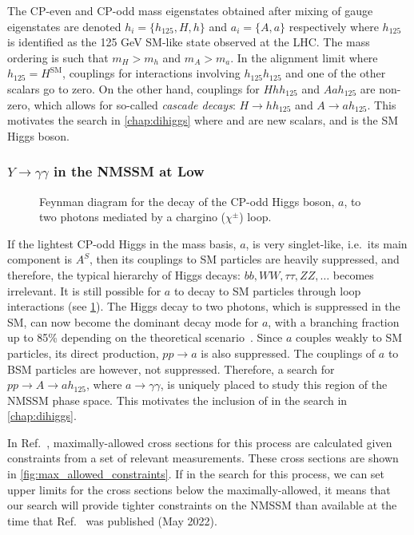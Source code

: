 The CP-even and CP-odd mass eigenstates obtained after mixing of gauge eigenstates are denoted $h_i=\{h_{125},H,h\}$ and $a_i=\{A,a\}$ respectively where $h_{125}$ is identified as the 125 GeV SM-like state observed at the LHC. The mass ordering is such that $m_H>m_h$ and $m_A>m_a$. In the alignment limit where $h_{125} = H^{\text{SM}}$, couplings for interactions involving $h_{125}h_{125}$ and one of the other scalars go to zero. On the other hand, couplings for $Hhh_{125}$ and $Aah_{125}$ are non-zero, which allows for so-called \textit{cascade decays}: $H\rightarrow h h_{125}$ and $A \rightarrow a h_{125}$. This motivates the \XYH search in \cref{chap:dihiggs} where \PX and \PY are new scalars, and \PH is the SM Higgs boson.

\subsubsection{$Y\rightarrow \gamma\gamma$ in the NMSSM at Low \mY}\label{sec:low_mass_in_NMSSM}

\begin{figure}
    \centering
    \caption[Feynman Diagram for a CP-Odd Higgs Boson Decaying to Two Photons Via a Chargino Loop]{Feynman diagram for the decay of the CP-odd Higgs boson, $a$, to two photons mediated by a chargino ($\chi^\pm$) loop.}\label{fig:a_gamgam}
   \end{figure}

If the lightest CP-odd Higgs in the mass basis, $a$, is very singlet-like, i.e.\ its main component is $A^S$, then its couplings to SM particles are heavily suppressed, and therefore, the typical hierarchy of Higgs decays: $bb, WW, \tau\tau, ZZ,\ldots$ becomes irrelevant. It is still possible for $a$ to decay to SM particles through loop interactions (see \cref{fig:a_gamgam}). The Higgs decay to two photons, which is suppressed in the SM, can now become the dominant decay mode for $a$, with a branching fraction up to 85\% depending on the theoretical scenario~\cite{King:2014xwa}. Since $a$ couples weakly to SM particles, its direct production, $pp \to a$ is also suppressed. The couplings of $a$ to BSM particles are however, not suppressed. Therefore, a search for $pp \rightarrow A \rightarrow a h_{125}$, where $a\to\gamma\gamma$, is uniquely placed to study this region of the NMSSM phase space. This motivates the inclusion of \Ygg in the \XYH search in \cref{chap:dihiggs}. 

In Ref.~\cite{Ellwanger:2022jtd}, maximally-allowed cross sections for this process are calculated given constraints from a set of relevant measurements. These cross sections are shown in \cref{fig:max_allowed_constraints}. If in the search for this process, we can set upper limits for the cross sections below the maximally-allowed, it means that our search will provide tighter constraints on the NMSSM than available at the time that Ref.~\cite{Ellwanger:2022jtd} was published (May 2022).


